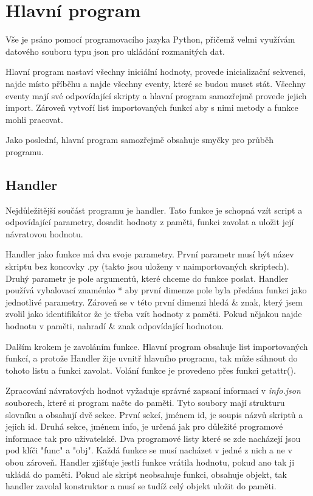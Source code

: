 \documentclass[12pt,a4paper]{article}
\begin{document}
\section{Hlavní program}
Vše je psáno pomocí programovacího jazyka Python, přičemž velmi využívám datového souboru typu json pro ukládání rozmanitých dat.

Hlavní program nastaví všechny iniciální hodnoty, provede inicializační sekvenci, najde místo příběhu a najde všechny eventy, které se budou muset stát. Všechny eventy mají své odpovídající skripty a hlavní program samozřejmě provede jejich import. Zároveň vytvoří list importovaných funkcí aby s nimi metody a funkce mohli pracovat.

Jako poslední, hlavní program samozřejmě obsahuje smyčky pro průběh programu.

\subsection{Handler}
Nejdůležitější součást programu je handler. Tato funkce je schopná vzít script a odpovídající parametry, dosadit hodnoty z paměti, funkci zavolat a uložit její návratovou hodnotu. 

Handler jako funkce má dva svoje parametry. První parametr musí být název skriptu bez koncovky .py (takto jsou uloženy v naimportovaných skriptech). Druhý parametr je pole argumentů, které chceme do funkce poslat. Handler používá vybalovací znaménko * aby první dimenze pole byla předána funkci jako jednotlivé parametry. Zároveň se v této první dimenzi hledá \& znak, který jsem zvolil jako identifikátor že je třeba vzít hodnoty z paměti. Pokud nějakou najde hodnotu v paměti, nahradí \& znak odpovídající hodnotou.

Dalším krokem je zavoláním funkce. Hlavní program obsahuje list importovaných funkcí, a protože Handler žije uvnitř hlavního programu, tak může sáhnout do tohoto listu a funkci zavolat. Volání funkce je provedeno přes funkci getattr().

Zpracování návratových hodnot vyžaduje správné zapsaní informací v \textit{info.json} souborech, které si program načte do paměti. Tyto soubory mají strukturu slovníku a obsahují dvě sekce. První sekcí, jménem id, je soupis názvů skriptů a jejich id. Druhá sekce, jménem info, je určená jak pro důležité programové informace tak pro uživatelské. Dva programové listy které se zde nacházejí jsou pod klíči "func" a "obj". Každá funkce se musí nacházet v jedné z nich a ne v obou zároveň. Handler zjišťuje jestli funkce vrátila hodnotu, pokud ano tak ji ukládá do paměti. Pokud ale skript neobsahuje funkci, obsahuje objekt, tak handler zavolal konstruktor a musí se tudíž celý objekt uložit do paměti.
\end{document}

